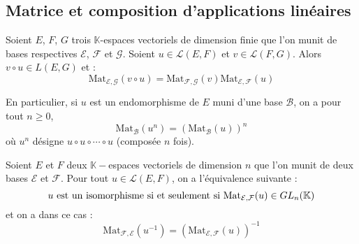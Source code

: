 \documentclass[french,11pt,twoside]{VcCours}
\begin{document}
%
%
\subsection{Matrice et composition d'applications linéaires}

\begin{Proposition}{}
Soient $E$, $F$, $G$ trois $\mathbb{K}$-espaces vectoriels de dimension finie que l'on munit de bases respectives $\mathcal{E}$, $\mathcal{F}$ et $\mathcal{G}$. Soient $u \in \mathcal{L}(E,F)$ et $v \in \mathcal{L}(F,G)$. Alors $v \circ u \in L(E,G)$ et :
$$ \textrm{Mat}_{\mathcal{E}, \mathcal{G}}(v \circ u) = \textrm{Mat}_{\mathcal{F}, \mathcal{G}}(v ) \textrm{Mat}_{\mathcal{E}, \mathcal{F}}( u)$$
\end{Proposition}

\begin{Remarque}{} En particulier, si $u$ est un endomorphisme de $E$ muni d'une base $\mathcal{B}$, on a pour tout $n \geq 0$,
$$ \textrm{Mat}_{\mathcal{B}}(u^n) = \left(\textrm{Mat}_{\mathcal{B}}(u)\right)^n$$
où $u^n$ désigne $u \circ u \circ \cdots \circ u$ (composée $n$ fois).
\end{Remarque}

\begin{Corollaire}{} Soient $E$ et $F$ deux $\mathbb{K}-$espaces vectoriels  de dimension $n$ que l'on munit de deux bases $\mathcal{E}$ et $\mathcal{F}$. Pour tout $u \in \mathcal{L}(E,F)$, on a l'équivalence suivante :
$$ u \hbox{ est un isomorphisme si et seulement si } \textrm{Mat}_{\mathcal{E}, \mathcal{F}}(u) \in GL_n (\mathbb{K})$$
et on a dans ce cas :
$$ \textrm{Mat}_{\mathcal{F}, \mathcal{E}}(u^{-1}) = \left( \textrm{Mat}_{\mathcal{E}, \mathcal{F}}(u) \right)^{-1}$$
\end{Corollaire}
\end{document}
